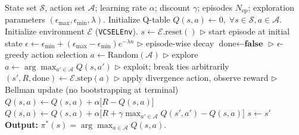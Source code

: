 \documentclass[twocolumn,twoside]{IEEEtran}
\theoremstyle{break}
\begin{document}
\begin{algorithm}
	\caption{Q-Learning for Adaptive Divergence Control}
	\label{alg:q_learning}
	\begin{algorithmic}[1]
		\REQUIRE State set $\mathcal{S}$, action set $\mathcal{A}$; learning rate $\alpha$; discount $\gamma$; episodes $N_{\text{ep}}$; exploration parameters $(\epsilon_{\max}, \epsilon_{\min}, \lambda)$.
		\STATE Initialize Q-table $Q(s,a)\leftarrow 0,\;\forall s\in\mathcal{S},a\in\mathcal{A}$.
		\STATE Initialize environment $\mathcal{E}$ (\texttt{VCSELEnv}).
		\STATE $s \leftarrow \mathcal{E}.\text{reset}()$ \hfill $\triangleright$ start episode at initial state
		\STATE $\epsilon \leftarrow \epsilon_{\min} + (\epsilon_{\max}-\epsilon_{\min}) e^{-\lambda n}$ \hfill $\triangleright$ episode-wise decay
		\STATE $\text{done} \leftarrow \textbf{false}$
		\STATE \hfill $\triangleright$ $\epsilon$-greedy action selection
		\STATE $a \leftarrow \text{Random}(\mathcal{A})$ \hfill $\triangleright$ explore
		\ELSE
		\STATE $a \leftarrow \arg\max_{a' \in \mathcal{A}} Q(s,a')$ \hfill $\triangleright$ exploit; break ties arbitrarily
		\ENDIF
		\STATE $(s', R, \text{done}) \leftarrow \mathcal{E}.\text{step}(a)$ \hfill $\triangleright$ apply divergence action, observe reward
		\STATE \hfill $\triangleright$ Bellman update (no bootstrapping at terminal)
		\STATE $Q(s,a) \leftarrow Q(s,a) + \alpha \big[R - Q(s,a)\big]$
		\ELSE
		\STATE $Q(s,a) \leftarrow Q(s,a) + \alpha \big[R + \gamma \max_{a' \in \mathcal{A}} Q(s',a') - Q(s,a)\big]$
		\ENDIF
		\STATE $s \leftarrow s'$
		\ENDWHILE
		\ENDFOR
		\STATE \textbf{Output:} $\pi^{*}(s) = \arg\max_{a \in \mathcal{A}} Q(s,a)$.
	\end{algorithmic}
\end{algorithm}



\end{document}
